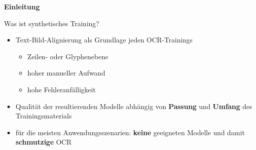 \documentclass{bbawslides}
\begin{document}
\begin{bbawpart}{\Large\bf Einleitung}
\end{bbawpart}

\begin{bbawslide}{Was ist synthetisches Training?}
  \vspace*{7mm}%
  \centerslidestrue%
  \begin{itemize}
    \item Text-Bild-Alignierung als Grundlage jeden OCR-Trainings
    \begin{itemize}
      \item Zeilen- oder Glyphenebene
      \item hoher manueller Aufwand
      \item hohe Fehleranfälligkeit
    \end{itemize}
  \end{itemize}
  \begin{center}
  \end{center}
  \begin{itemize}
    \item Qualität der resultierenden Modelle abhängig von \textbf{Passung} und \textbf{Umfang} des Trainingsmaterials
    \item für die meisten Anwendungsszenarien: \textbf{keine} geeigneten Modelle und damit \textbf{schmutzige} OCR
  \end{itemize}
\end{bbawslide}
\end{document}
